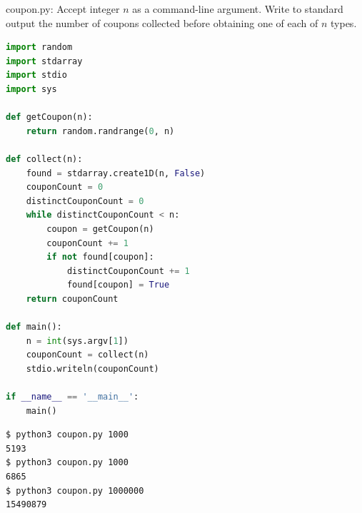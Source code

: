 \documentclass[8pt,a4paper,compress]{beamer}
\begin{document}
\begin{frame}[fragile]
\pause

\begin{framed}
\tiny coupon.py: Accept integer $n$ as a command-line argument. Write to standard output the number of coupons collected before obtaining one of each of $n$ types.
\end{framed}

\begin{lstlisting}[language=Python]
import random
import stdarray
import stdio
import sys

def getCoupon(n):
    return random.randrange(0, n)

def collect(n):
    found = stdarray.create1D(n, False)
    couponCount = 0
    distinctCouponCount = 0
    while distinctCouponCount < n:
        coupon = getCoupon(n)
        couponCount += 1
        if not found[coupon]:
            distinctCouponCount += 1
            found[coupon] = True
    return couponCount

def main():
    n = int(sys.argv[1])
    couponCount = collect(n)
    stdio.writeln(couponCount)

if __name__ == '__main__':
    main()
\end{lstlisting}
\end{frame}

\begin{frame}[fragile]
\pause

\begin{lstlisting}[language={}]
$ python3 coupon.py 1000
5193
$ python3 coupon.py 1000
6865
$ python3 coupon.py 1000000
15490879
\end{lstlisting}
\end{frame}
\end{document}

